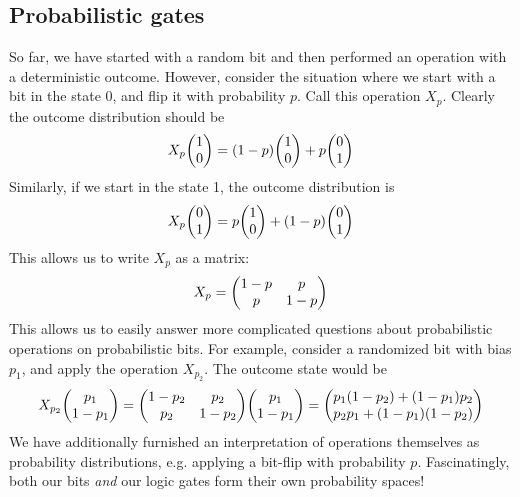\documentclass{article}
\begin{document}
\subsection{Probabilistic gates}
So far, we have started with a random bit and then performed an operation with a deterministic outcome. However, consider the situation where we start with a bit in the state $0$, and flip it with probability $p$. Call this operation $X_p$. Clearly the outcome distribution should be
$$
X_p\mqty(1 \\ 0) = (1-p)\mqty(1 \\ 0) + p\mqty(0 \\ 1)
$$
Similarly, if we start in the state 1, the outcome distribution is
$$
X_p\mqty(0 \\ 1) = p\mqty(1 \\ 0) + (1-p)\mqty(0 \\ 1)
$$
This allows us to write $X_p$ as a matrix:
$$
X_p = \mqty(1-p & p \\ p & 1-p)
$$
This allows us to easily answer more complicated questions about probabilistic operations on probabilistic bits. For example, consider a randomized bit with bias $p_1$, and apply the operation $X_{p_2}$. The outcome state would be
$$
X_{p_2}\mqty(p_1 \\ 1-p_1) = \mqty(1-p_2 & p_2 \\ p_2 & 1-p_2)\mqty(p_1 \\ 1-p_1) = \mqty(p_1(1-p_2) + (1-p_1)p_2 \\ p_2p_1 + (1-p_1)(1-p_2))
$$
We have additionally furnished an interpretation of operations themselves as probability distributions, e.g. applying a bit-flip with probability $p$. Fascinatingly, both our bits \textit{and} our logic gates form their own probability spaces!
\end{document}
